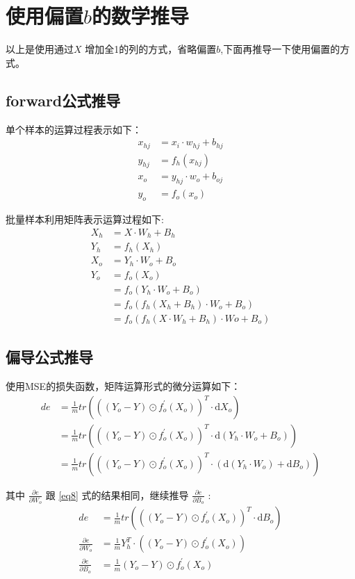\documentclass[12pt, a4paper, oneside]{ctexart}
\begin{document}
\newpage
\section{使用偏置$b$的数学推导}
以上是使用通过$X$ 增加全1的列的方式，省略偏置$b$,下面再推导一下使用偏置的方式。
\subsection{forward公式推导}
单个样本的运算过程表示如下：
\begin{align}    
    x_{hj} &= x_i \cdot w_{hj} + b_{hj} \nonumber\\
    y_{hj} &= f_h(x_{hj})               \nonumber\\
    x_o &= y_{hj} \cdot w_{o} + b_{oj}  \nonumber\\
    y_{o} &= f_o(x_o)                   \nonumber
\end{align}

批量样本利用矩阵表示运算过程如下:
\begin{align}
	X_h  &= X \cdot W_h + B_h 						\nonumber\\
	Y_h  &= f_h(X_h) 								\nonumber\\
	X_o  &= Y_h \cdot W_o + B_o						\nonumber\\
    Y_o  &= f_o(X_o) 								\nonumber\\
    	 &= f_o(Y_h \cdot W_o + B_o) 				\nonumber\\
    	 &= f_o(f_h(X_h + B_h) \cdot W_o + B_o) 	\nonumber\\
         &= f_o(f_h(X \cdot W_h+ B_h) \cdot Wo + B_o) \label{eq12}
\end{align}

\subsection{偏导公式推导}
使用MSE的损失函数，矩阵运算形式的微分运算如下：
\begin{align}
    de &= \frac{1}{m}tr(((Y_o - Y) \odot f_o^{'}(X_o))^T \cdot \mathrm{d}X_o) \nonumber\\
       &= \frac{1}{m}tr(((Y_o - Y) \odot f_o^{'}(X_o))^T \cdot \mathrm{d}(Y_h \cdot W_o + B_o)) \nonumber\\
       &= \frac{1}{m}tr(((Y_o - Y) \odot f_o^{'}(X_o))^T \cdot (\mathrm{d}(Y_h \cdot W_o) + \mathrm{d}B_o)) \nonumber
\end{align}

其中 $\frac{\partial e}{\partial W_o}$ 跟 \eqref{eq8} 式的结果相同，继续推导 
$ \frac{\partial e}{\partial B_o} $ :
\begin{align}
de &= \frac{1}{m}tr(((Y_o - Y) \odot f_o^{'}(X_o))^T \cdot \mathrm{d}B_o) \nonumber\\
\frac{\partial e}{\partial W_o} &= \frac{1}{m}Y_h^T \cdot ((Y_o - Y) \odot f_o^{'}(X_o))    \nonumber\\
    \frac{\partial e}{\partial B_o} &= \frac{1}{m}(Y_o - Y) \odot f_o^{'}(X_o) \nonumber
\end{align}
\end{document}
